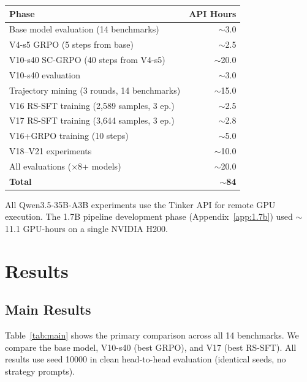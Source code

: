 \documentclass{article}
\begin{document}
\begin{table}[ht]
\vskip 0.1in
\begin{center}
\begin{small}
\begin{tabular}{lr}
\toprule
Phase & API Hours \\
\midrule
Base model evaluation (14 benchmarks) & $\sim$3.0 \\
V4-s5 GRPO (5 steps from base) & $\sim$2.5 \\
V10-s40 SC-GRPO (40 steps from V4-s5) & $\sim$20.0 \\
V10-s40 evaluation & $\sim$3.0 \\
Trajectory mining (3 rounds, 14 benchmarks) & $\sim$15.0 \\
V16 RS-SFT training (2,589 samples, 3 ep.) & $\sim$2.5 \\
V17 RS-SFT training (3,644 samples, 3 ep.) & $\sim$2.8 \\
V16+GRPO training (10 steps) & $\sim$5.0 \\
V18--V21 experiments & $\sim$10.0 \\
All evaluations ($\times$8+ models) & $\sim$20.0 \\
\midrule
\textbf{Total} & $\sim$\textbf{84} \\
\bottomrule
\end{tabular}
\end{small}
\end{center}
\vskip -0.15in
\end{table}

All Qwen3.5-35B-A3B experiments use the Tinker API for remote GPU execution. The 1.7B pipeline development phase (Appendix~\ref{app:1.7b}) used $\sim$11.1 GPU-hours on a single NVIDIA H200.

\section{Results}
\label{sec:results}

\subsection{Main Results}
\label{sec:main-results}

Table~\ref{tab:main} shows the primary comparison across all 14 benchmarks. We compare the base model, V10-s40 (best GRPO), and V17 (best RS-SFT). All results use seed 10000 in clean head-to-head evaluation (identical seeds, no strategy prompts).
\end{document}
